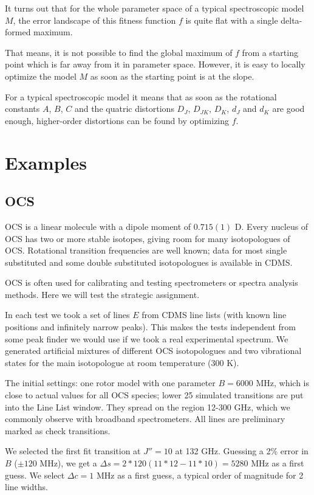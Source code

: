 \documentclass[11pt]{article}
\begin{document}
It turns out that for the whole parameter space of a typical spectroscopic model $M$, the error landscape of this fitness function $f$ is quite flat with a single delta-formed maximum. 

That means, it is not possible to find the global maximum of $f$ from a starting point which is far away from it in parameter space. However, it is easy to locally optimize the model $M$ as soon as the starting point is at the slope. 

For a typical spectroscopic model it means that as soon as the rotational constants $A$, $B$, $C$ and the quatric distortions $D_J$, $D_{JK}$, $D_K$, $d_J$ and $d_K$ are good enough, higher-order distortions can be found by optimizing $f$.

\section{Examples}
\subsection{OCS}

OCS is a linear molecule with a dipole moment of $0.715(1)$ D. Every nucleus of OCS has two or more stable isotopes, giving room for many isotopologues of OCS. Rotational transition frequencies are well known; data for most single substituted and some double substituted isotopologues is available in CDMS.

OCS is often used for calibrating and testing spectrometers or spectra analysis methods. Here we will test the strategic assignment. 

In each test we took a set of lines $E$ from CDMS line lists (with known line positions and infinitely narrow peaks). This makes the tests independent from some peak finder we would use if we took a real experimental spectrum. We generated artificial mixtures of different OCS isotopologues and two vibrational states for the main isotopologue at room temperature (300 K).

The initial settings: one rotor model with one parameter $B = 6000$ MHz, which is close to actual values for all OCS species; lower 25 simulated transitions are put into the Line List window. They spread on the region 12-300 GHz, which we commonly observe with broadband spectrometers. All lines are preliminary marked as check transitions. 

We selected the first fit transition at $J'' = 10$ at 132 GHz. Guessing a 2\% error in $B$ ($\pm 120$ MHz), we get a $\Delta s = 2*120(11*12 - 11*10) = 5280$ MHz as a first guess. We select $\Delta c = 1$ MHz as a first guess, a typical order of magnitude for 2 line widths.
\end{document}
